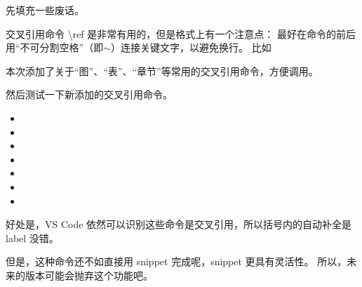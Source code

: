 \documentclass[../Main/thesis]{subfiles}
\begin{document}
先填充一些废话。\zhlipsum[10]

交叉引用命令 \textbackslash ref 是非常有用的，但是格式上有一个注意点：
最好在命令的前后用“不可分割空格”（即$\sim$）连接关键文字，以避免换行。
比如

本次添加了关于“图”、“表”、“章节”等常用的交叉引用命令，方便调用。

然后测试一下新添加的交叉引用命令。
\begin{itemize}[\textbullet]
  \item {}
  \item {}
  \item {}
  \item {}
  \item {}
  \item {}
  \item {}
\end{itemize}

好处是，VS Code 依然可以识别这些命令是交叉引用，所以括号内的自动补全是 label 没错。

但是，这种命令还不如直接用 snippet 完成呢，snippet 更具有灵活性。
所以，未来的版本可能会抛弃这个功能吧。
\end{document}
